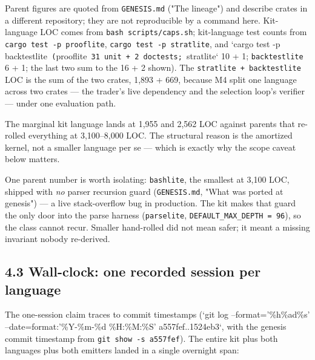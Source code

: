 \documentclass[11pt]{article}
\newcommand{\code}[1]{\texttt{#1}}
\begin{document}
Parent figures are quoted from \code{GENESIS.md} ("The lineage") and describe crates
in a different repository; they are not reproducible by a command here.
Kit-language LOC comes from \code{bash scripts/caps.sh}; kit-language test counts
from \code{cargo test -p prooflite}, \code{cargo test -p stratlite}, and `cargo test -p
backtestlite\code{ (}prooflite\code{ 31 unit + 2 doctests; }stratlite` 10 + 1;
\code{backtestlite} 6 + 1; the last two sum to the 16 + 2 shown). The
\code{stratlite + backtestlite} LOC is the sum of the two crates, 1,893 + 669,
because M4 split one language across two crates --- the trader's live dependency
and the selection loop's verifier --- under one evaluation path.

The marginal kit language lands at 1,955 and 2,562 LOC against parents that
re-rolled everything at 3,100--8,000 LOC. The structural reason is the amortized
kernel, not a smaller language per se --- which is exactly why the scope caveat
below matters.

One parent number is worth isolating: \code{bashlite}, the smallest at 3,100 LOC,
shipped with \emph{no} parser recursion guard (\code{GENESIS.md}, "What was ported at
genesis") --- a live stack-overflow bug in production. The kit makes that guard
the only door into the parse harness (\code{parselite}, \code{DEFAULT\_MAX\_DEPTH = 96}), so
the class cannot recur. Smaller hand-rolled did not mean safer; it meant a
missing invariant nobody re-derived.

\subsection*{4.3 Wall-clock: one recorded session per language}

The one-session claim traces to commit timestamps (`git log
--format='\%h\textbar{}\%ad\textbar{}\%s' --date=format:'\%Y-\%m-\%d \%H:\%M:\%S' a557fef..1524eb3`, with
the genesis commit timestamp from \code{git show -s a557fef}). The entire kit plus
both languages plus both emitters landed in a single overnight span:
\end{document}
